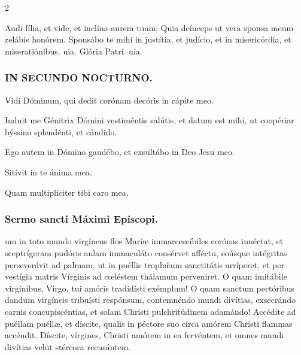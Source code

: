 \documentclass[9pt,twoside]{extarticle}
\begin{document}
\begin{multicols}{2}
\begin{tightlist}{}
\item {} Audi fília, et vide, et inclína aurem tuam; \textred{*} Quia deínceps ut vera sponsa meum zelábis honórem.  Sponsábo te mihi in justítia, et judício, et in misericórdia, et miseratiónibus. uia. Glória Patri. uia.
\end{tightlist}

\subsubsection*{\center \textsc{IN SECUNDO NOCTURNO.}}
\begin{tightlist}{}
\item {} Vidi Dóminum, qui dedit corónam decóris in cápite meo.
\item {} Induit me Génitrix Dómini vestiméntis salútis, et datum est mihi, ut coopériar býssino splendénti, et cándido.
\item {} Ego autem in Dómino gaudébo, et exsultábo in Deo Jesu meo.
\item {} Sitívit in te ánima mea. 
\item {} Quam multiplíciter tibi caro mea.
\end{tightlist}

\subsubsection*{\center Sermo sancti Máximi Epíscopi.}
\begin{center}\end{center}
um in toto mundo virgíneus flos Maríæ immarcescíbiles corónas innéctat, et sceptrígeram pudóris aulam immaculáto consérvet afféctu, eoúsque intégritas perseverávit ad palmam, ut in puéllis trophǽum sanctitátis arríperet, et per vestígia matris Vírginis ad cœléstem thálamum perveníret. O quam imitábile virgínibus, Virgo, tui amóris tradidísti exémplum! O quam sanctum pectóribus dandum virgíneis tribuísti respónsum, contemnéndo mundi divítias, exsecrándo carnis concupiscéntias, et solam Christi pulchritúdinem adamándo! Accédite ad puéllam puéllæ, et díscite, qualis in péctore suo circa amórem Christi flammas accéndit. Díscite, vírgines, Christi amórem in ea fervéntem, et omnes mundi divítias velut stércora recusántem.


\end{multicols}
\end{document}
